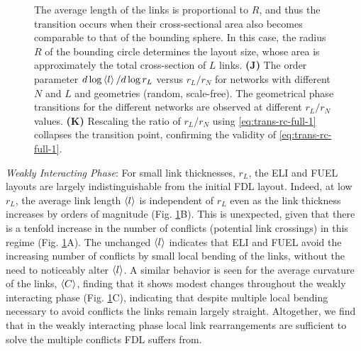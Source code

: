 \documentclass[endfloats,nofootinbib,preprint,floatfix,titlepage,superscriptaddress,linenumbers]{revtex4-1} %
\begin{document}
\begin{figure}
{{    %
    The average length of the links is proportional to $R$, and thus the transition occurs when their cross-sectional area also becomes comparable to that of the bounding sphere. 
    In this case, the radius $R$ of the bounding circle determines the layout size, whose area is approximately the total cross-section of $L$ links. 
    {\bf (J)} The order parameter $d\log\left<l\right>/d\log r_L$ versus $r_L/r_N$ for networks with different $N$ and $L$ and geometries (random, scale-free). 
    The geometrical phase transitions for the different networks are observed at different $r_L/r_N$ values. 
    {\bf (K)} Rescaling the ratio of $r_L/r_N$ using \eqref{eq:trans-rc-full-1}  collapses the transition point, %
    confirming the validity of \eqref{eq:trans-rc-full-1}.
    }%
    \vspace{-2cm}
          }    
    \label{fig:trans}
    \label{fig:phase-compare}
\end{figure}

{\em Weakly Interacting Phase}: For small link thicknesses, $r_L$, the ELI and FUEL layouts are largely indistinguishable from the initial FDL layout.
Indeed, at low $r_L$, the average link length $\left<l\right>$ is independent of $r_L$ even as the link thickness increases by orders of magnitude (Fig. \ref{fig:phase-compare}B).
This is unexpected, given that there is a tenfold increase in the number of  conflicts (potential link crossings) in this regime (Fig. \ref{fig:phase-compare}A). %
The unchanged $\left<l\right>$ indicates that ELI and FUEL avoid the increasing number of conflicts by small local bending of the links, without the need to noticeably alter $\left<l\right>$.
A similar behavior is seen for the average curvature of the links, $\left<C\right>$, finding that it shows modest changes throughout the weakly interacting phase (Fig. \ref{fig:phase-compare}C), indicating that despite multiple local bending necessary to avoid conflicts the links remain largely straight. 
Altogether, we find that in the weakly interacting phase local link rearrangements are sufficient to solve the multiple conflicts FDL suffers from. 
\end{document}
